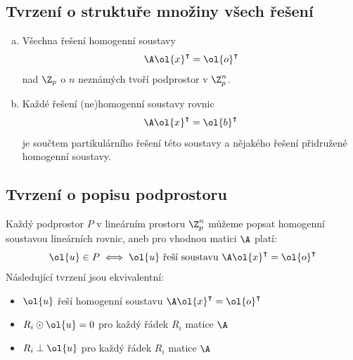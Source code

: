 \subsection{Tvrzení o struktuře množiny všech řešení}
\begin{enumerate}[a)]
	\item Všechna řešení homogenní soustavy
	\begin{equation}
		\A \ol{x}^\intercal = \ol{o}^\intercal
	\end{equation}
	nad $\Z_p$ o $n$ neznámých tvoří podprostor v $\Z_p^n$.
	\item Každé řešení (ne)homogenní soustavy rovnic
	\begin{equation}
		\A\ol{x}^\intercal = \ol{b}^\intercal
	\end{equation}
	je součtem partikulárního řešení této soustavy a nějakého řešení přidružené homogenní soustavy.
\end{enumerate}

\subsection{Tvrzení o popisu podprostoru}
Každý podprostor $P$ v lineárním prostoru $\Z_p^n$ můžeme popsat homogenní soustavou lineárních rovnic, aneb pro vhodnou matici $\A$ platí:
\begin{equation}
	\ol{u} \in P \iff \ol{u} \text{ řeší soustavu } \A \ol{x}^\intercal = \ol{o}^\intercal
\end{equation}
Následující tvrzení jsou ekvivalentní:
\vspace{-1em}
\begin{itemize}
	\item $\ol{u}$ řeší homogenní soustavu $\A \ol{x}^\intercal = \ol{o}^\intercal$
	\item $R_i \odot \ol{u} = 0$ pro každý řádek $R_i$ matice $\A$
	\item $R_i \perp \ol{u}$ pro každý řádek $R_i$ matice $\A$
\end{itemize}

